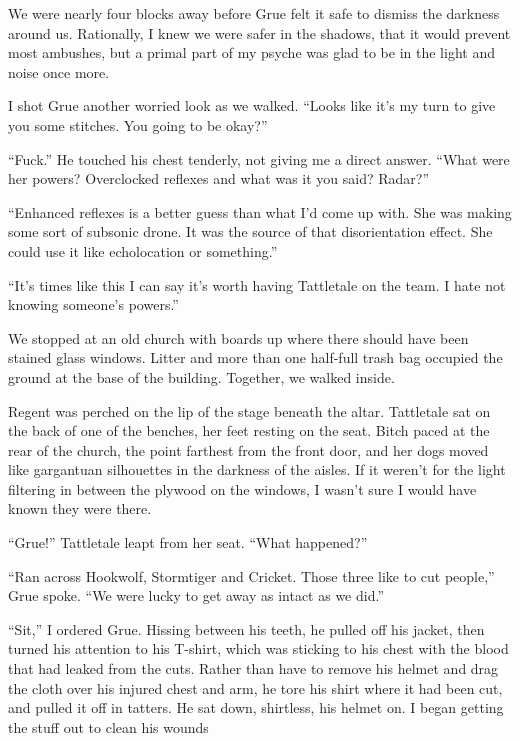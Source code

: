 We were nearly four blocks away before Grue felt it safe to dismiss the darkness around us.  Rationally, I knew we were safer in the shadows, that it would prevent most ambushes, but a primal part of my psyche was glad to be in the light and noise once more.



I shot Grue another worried look as we walked.  ``Looks like it's my turn to give you some stitches.  You going to be okay?''



``Fuck.''  He touched his chest tenderly, not giving me a direct answer.  ``What were her powers?  Overclocked reflexes and what was it you said?  Radar?''



``Enhanced reflexes is a better guess than what I'd come up with.  She was making some sort of subsonic drone.  It was the source of that disorientation effect.  She could use it like echolocation or something.''



``It's times like this I can say it's worth having Tattletale on the team.  I hate not knowing someone's powers.''



We stopped at an old church with boards up where there should have been stained glass windows.  Litter and more than one half-full trash bag occupied the ground at the base of the building.  Together, we walked inside.



Regent was perched on the lip of the stage beneath the altar.  Tattletale sat on the back of one of the benches, her feet resting on the seat.  Bitch paced at the rear of the church, the point farthest from the front door, and her dogs moved like gargantuan silhouettes in the darkness of the aisles.  If it weren't for the light filtering in between the plywood on the windows, I wasn't sure I would have known they were there.



``Grue!'' Tattletale leapt from her seat.  ``What happened?''



``Ran across Hookwolf, Stormtiger and Cricket.  Those three like to cut people,'' Grue spoke.  ``We were lucky to get away as intact as we did.''



``Sit,'' I ordered Grue.  Hissing between his teeth, he pulled off his jacket, then turned his attention to his T-shirt, which was sticking to his chest with the blood that had leaked from the cuts.  Rather than have to remove his helmet and drag the cloth over his injured chest and arm, he tore his shirt where it had been cut, and pulled it off in tatters.  He sat down, shirtless, his helmet on.  I began getting the stuff out to clean his wounds



